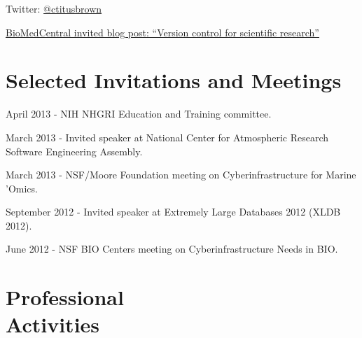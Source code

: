 \documentclass[margin,line]{resume}
\begin{document}
\begin{resume}
Twitter: \href{http://twitter.com/ctitusbrown}{@ctitusbrown}

\href{http://blogs.biomedcentral.com/bmcblog/2013/02/28/version-control-for-scientific-research/}{BioMedCentral invited blog post: ``Version control for scientific research''}

\section{\mysidestyle Selected Invitations and Meetings}

\begin{list1}

\item[] April 2013 - NIH NHGRI Education and Training committee.
\item[] March 2013 - Invited speaker at National Center for Atmospheric Research Software Engineering Assembly.
\item[] March 2013 - NSF/Moore Foundation meeting on Cyberinfrastructure for Marine 'Omics.
\item[] September 2012 - Invited speaker at Extremely Large Databases 2012 (XLDB 2012).
\item[] June 2012 - NSF BIO Centers meeting on Cyberinfrastructure Needs in BIO.

\end{list1}

    \section{\mysidestyle Professional\\Activities}


\end{resume}
\end{document}
